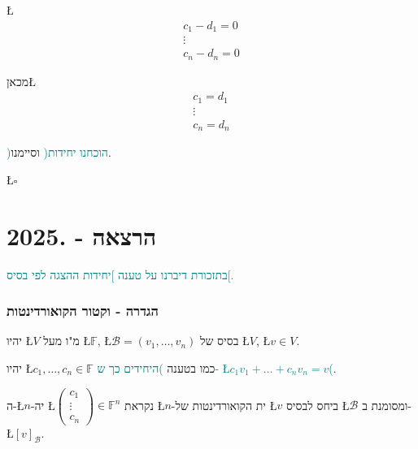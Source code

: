\documentclass[english,hebrew]{article}
\begin{document}
\L{%
\[
\begin{array}{c}
c_{1}-d_{1}=0\\
\vdots\\
c_{n}-d_{n}=0
\end{array}
\]
}%

מכאן\L{%
\[
\begin{array}{c}
c_{1}=d_{1}\\
\vdots\\
c_{n}=d_{n}
\end{array}
\]
}%

\textcolor{teal}{)הוכחנו יחידות(} וסיימנו.
\begin{flushright}
\L{$\square$}
\par\end{flushright}

\newpage{}

\noindent{}

\part{הרצאה {\endL} - {.2025\endL}}

\textcolor{teal}{בתזכורת דיברנו על טענה {]}יחידות ההצגה לפי בסיס{[}.}\textcolor{blue}{{} }

\section{הגדרה - וקטור הקואורדינטות}

יהיו \L{$V$} מ"ו מעל \L{$\mathbb{F}$}, \L{$\mathcal{B}=(v_{1},\dots,v_{n})$}
בסיס של \L{$V$}, \L{$v\in V$}.

יהיו \L{$c_{1},\dots,c_{n}\in\mathbb{F}$} כמו בטענה \textcolor{teal}{)היחידים
כך ש- \L{$c_{1}v_{1}+\dots+c_{n}v_{n}=v$}(}.

ה-\L{$n$}-יה \L{$\begin{pmatrix}c_{1}\\
\vdots\\
c_{n}
\end{pmatrix}\in\mathbb{F}^{n}$} נקראת \L{$n$}-ית הקואורדינטות של \L{$v$} ביחס לבסיס \L{$\mathcal{B}$}
ומסומנת ב- \L{$[v]_{\mathcal{B}}$}.
\end{document}

